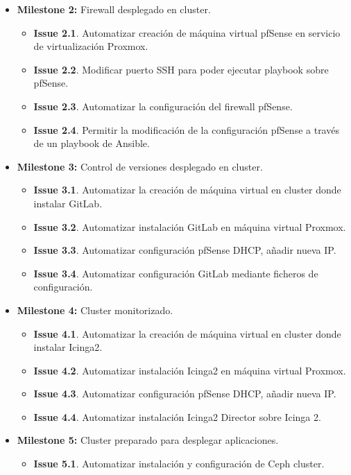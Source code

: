 \begin{text}
\begin{itemize}
\begin{itemize}
		\end{itemize}
		\item \textbf{Milestone 2:} Firewall desplegado en cluster.
		\begin{itemize}
			\item \textbf{Issue 2.1}. Automatizar creación de máquina virtual pfSense en servicio de virtualización Proxmox.
			\item \textbf{Issue 2.2}. Modificar puerto SSH para poder ejecutar playbook sobre pfSense.
			\item \textbf{Issue 2.3}. Automatizar la configuración del firewall pfSense.
			\item \textbf{Issue 2.4}. Permitir la modificación de la configuración pfSense a través de un playbook de Ansible.
		\end{itemize}
		\item \textbf{Milestone 3:} Control de versiones desplegado en cluster.
		\begin{itemize}
			\item \textbf{Issue 3.1}. Automatizar la creación de máquina virtual en cluster donde instalar GitLab.
			\item \textbf{Issue 3.2}. Automatizar instalación GitLab en máquina virtual Proxmox.
			\item \textbf{Issue 3.3}. Automatizar configuración pfSense DHCP, añadir nueva IP.
			\item \textbf{Issue 3.4}. Automatizar configuración GitLab mediante ficheros de configuración.
		\end{itemize}
		\item \textbf{Milestone 4:} Cluster monitorizado.
		\begin{itemize}
			\item \textbf{Issue 4.1}. Automatizar la creación de máquina virtual en cluster donde instalar Icinga2.
			\item \textbf{Issue 4.2}. Automatizar instalación Icinga2 en máquina virtual Proxmox.
			\item \textbf{Issue 4.3}. Automatizar configuración pfSense DHCP, añadir nueva IP.
			\item \textbf{Issue 4.4}. Automatizar instalación Icinga2 Director sobre Icinga 2.
		\end{itemize}
		\item \textbf{Milestone 5:} Cluster preparado para desplegar aplicaciones.
		\begin{itemize}
			\item \textbf{Issue 5.1}. Automatizar instalación y configuración de Ceph cluster.

\end{itemize}
\end{itemize}
\end{text}
